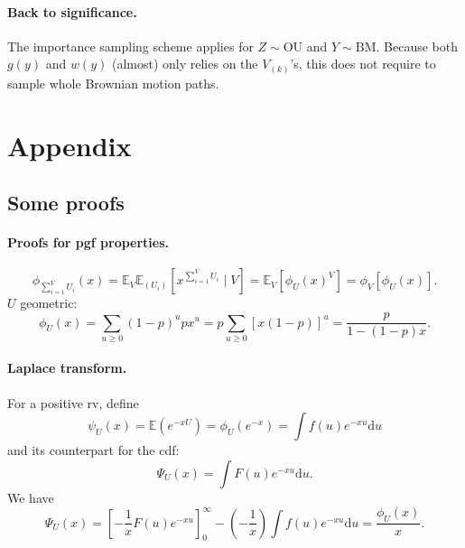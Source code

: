 \documentclass[a4paper,12pt]{article}
\newcommand{\BM}{\text{BM}}
\newcommand{\dd}{\text{d}}
\newcommand{\Esp}{\mathbb{E}}
\newcommand{\OU}{\text{OU}}
\begin{document}
\paragraph{Back to significance.} The importance sampling scheme applies for $Z \sim \OU$ and $Y \sim \BM$. Because both $g(y)$ and $w(y)$ (almost) only relies on the $V_{(k)}$'s, this does not require to sample whole Brownian motion paths.

\newpage
\section{Appendix}

\subsection{Some proofs}

\paragraph{Proofs for pgf properties.}
$$
\phi_{\sum_{i=1}^V U_i}(x) = \Esp_V \Esp_{(U_i)}\left[x^{\sum_{i=1}^V U_i} \;|\; V\right] 
 = \Esp_V \left[\phi_U(x)^V\right] 
 = \phi_V\left[\phi_U(x)\right].
$$
$U$ geometric:
$$
\phi_U(x) = \sum_{u \geq 0} (1-p)^u p x^u 
= p \sum_{u \geq 0} [x(1-p)]^u 
= \frac{p}{1 - (1-p)x}.
$$

\paragraph{Laplace transform.} For a positive rv, define
$$
\psi_U(x) = \Esp(e^{-xU}) = \phi_U(e^{-x}) = \int f(u) e^{-xu} \dd u
$$
and its counterpart for the cdf:
$$
\Psi_U(x) = \int F(u) e^{-xu} \dd u.
$$
We have
$$
\Psi_U(x) = \left[ - \frac1x F(u) e^{-xu}\right]_0^\infty - \left(-\frac1x\right) \int f(u) e^{-xu} \dd u = \frac{\phi_U(x)}x.
$$

\end{document}
